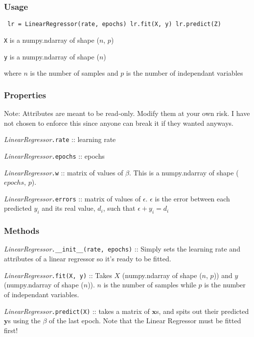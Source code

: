 \documentclass{article}
\begin{document}
\subsubsection{Usage}

\begin{verbatim} lr = LinearRegressor(rate, epochs) lr.fit(X, y) lr.predict(Z)
\end{verbatim}

\texttt{X} is a numpy.ndarray of shape ($n$, $p$)

\texttt{y} is a numpy.ndarray of shape ($n$)

where $n$ is the number of samples and $p$ is the number of independant
variables

\subsubsection{Properties}

Note: Attributes are meant to be read-only. Modify them at your own risk. I have
not chosen to enforce this since anyone can break it if they wanted anyways.

\textit{LinearRegressor}\texttt{.rate} :: learning rate

\textit{LinearRegressor}\texttt{.epochs} :: epochs

\textit{LinearRegressor}\texttt{.w} :: matrix of values of $\beta$. This is a
numpy.ndarray of shape ($epochs$, $p$).

\textit{LinearRegressor}\texttt{.errors} :: matrix of values of $\epsilon$.
$\epsilon$ is the error between each predicted $y_i$ and its real value, $d_i$,
such that $\epsilon + y_i = d_i$

\subsubsection{Methods}

\textit{LinearRegressor}\texttt{.\_\_init\_\_(rate, epochs)} :: Simply sets the
learning rate and attributes of a linear regressor so it's ready to be fitted.

\textit{LinearRegressor}\texttt{.fit(X, y)} :: Takes $X$ (numpy.ndarray of shape
($n$, $p$)) and $y$ (numpy.ndarray of shape ($n$)). $n$ is the number of samples
while $p$ is the number of independant variables.

\textit{LinearRegressor}\texttt{.predict(X)} :: takes a matrix of $\mathbf{x}$s,
and spits out their predicted $\textbf{y}$s using the $\beta$ of the last epoch.
Note that the Linear Regressor must be fitted first!
\end{document}
